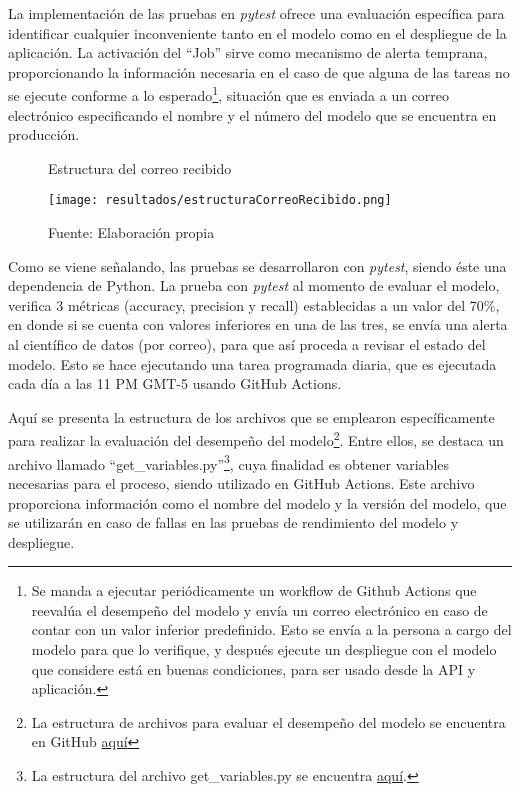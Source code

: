 \newpage

La implementación de las pruebas en \textit{pytest} ofrece una evaluación específica para identificar cualquier inconveniente tanto en el modelo como en el despliegue de la aplicación. La activación del ``Job'' sirve como mecanismo de alerta temprana, proporcionando la información necesaria en el caso de que alguna de las tareas no se ejecute conforme a lo esperado\footnote{Se manda a ejecutar periódicamente un workflow de Github Actions que reevalúa el desempeño del modelo y envía un correo electrónico en caso de contar con un valor inferior predefinido. Esto se envía a la persona a cargo del modelo para que lo verifique, y después ejecute un despliegue con el modelo que considere está en buenas condiciones, para ser usado desde la API y aplicación.}, situación que es enviada a un correo electrónico especificando el nombre y el número del modelo que se encuentra en producción.

\newpage

\begin{figure}[h]
	\centering
	\caption{Estructura del correo recibido}
	\texttt{[image: resultados/estructuraCorreoRecibido.png]}
	\caption*{\footnotesize Fuente: Elaboración propia}
	\label{fig:figuraEstructuraCorreoRecibido}
\end{figure}

Como se viene señalando, las pruebas se desarrollaron con \textit{pytest}, siendo éste una dependencia de Python. La prueba con \textit{pytest} al momento de evaluar el modelo, verifica 3 métricas (accuracy, precision y recall) establecidas a un valor del 70\%, en donde si se cuenta con valores inferiores en una de las tres, se envía una alerta al científico de datos (por correo), para que así proceda a revisar el estado del modelo. Esto se hace ejecutando una tarea programada diaria, que es ejecutada cada día a las 11 PM GMT-5 usando GitHub Actions. 

Aquí se presenta la estructura de los archivos que se emplearon específicamente para realizar la evaluación del desempeño del modelo\footnote{La estructura de archivos para evaluar el desempeño del modelo se encuentra en GitHub \href{https://github.com/juferoto/mlops_project/tree/master/training/tests}{aquí}}. Entre ellos, se destaca un archivo llamado ``get\_variables.py''\footnote{La estructura del archivo get\_variables.py se encuentra \href{https://github.com/juferoto/mlops_project/blob/master/training/tests/get_variables.py}{aquí}.}, cuya finalidad es obtener variables necesarias para el proceso, siendo utilizado en GitHub Actions. Este archivo proporciona información como el nombre del modelo y la versión del modelo, que se utilizarán en caso de fallas en las pruebas de rendimiento del modelo y despliegue.

